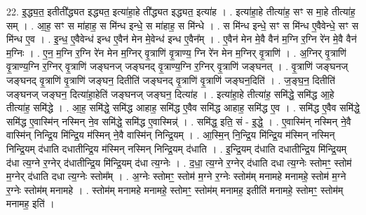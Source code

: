 \documentclass[17pt]{extarticle}
\begin{document}
22. इ॒द्ध्य॒त॒ इतीती᳚द्ध्यत इद्ध्यत॒ इत्या॑हा॒हे ती᳚द्ध्यत इद्ध्यत॒ इत्या॑ह । . इत्या॑हा॒हे तीत्या॑ह॒ सꣳ स मा॒हे तीत्या॑ह॒ सम् । . आ॒ह॒ सꣳ स मा॑हाह॒ स मि॑न्ध इन्धे॒ स मा॑हाह॒ स मि॑न्धे । . स मि॑न्ध इन्धे॒ सꣳ स मि॑न्ध ए॒वैवेन्धे॒ सꣳ स मि॑न्ध ए॒व । . इ॒न्ध॒ ए॒वैवेन्ध॑ इन्ध ए॒वैन॑ मेन मे॒वेन्ध॑ इन्ध ए॒वैन᳚म् । . ए॒वैन॑ मेन मे॒वै वैन॑ म॒ग्नि र॒ग्नि रे॑न मे॒वै वैन॑ म॒ग्निः । . ए॒न॒ म॒ग्नि र॒ग्नि रे॑न मेन म॒ग्निर् वृ॒त्राणि॑ वृ॒त्राण्य॒ ग्नि रे॑न मेन म॒ग्निर् वृ॒त्राणि॑ । . अ॒ग्निर् वृ॒त्राणि॑ वृ॒त्राण्य॒ग्नि र॒ग्निर् वृ॒त्राणि॑ जङ्घनज् जङ्घनद् वृ॒त्राण्य॒ग्नि र॒ग्निर् वृ॒त्राणि॑ जङ्घनत् । . वृ॒त्राणि॑ जङ्घनज् जङ्घनद् वृ॒त्राणि॑ वृ॒त्राणि॑ जङ्घन॒ दितीति॑ जङ्घनद् वृ॒त्राणि॑ वृ॒त्राणि॑ जङ्घन॒दिति॑ । . ज॒ङ्घ॒न॒ दितीति॑ जङ्घनज् जङ्घन॒ दित्या॑हा॒हेति॑ जङ्घनज् जङ्घन॒ दित्या॑ह । . इत्या॑हा॒हे तीत्या॑ह॒ समि॑द्धे॒ समि॑द्ध आ॒हे तीत्या॑ह॒ समि॑द्धे । . आ॒ह॒ समि॑द्धे॒ समि॑द्ध आहाह॒ समि॑द्ध ए॒वैव समि॑द्ध आहाह॒ समि॑द्ध ए॒व । . समि॑द्ध ए॒वैव समि॑द्धे॒ समि॑द्ध ए॒वास्मि॑न् नस्मिन् ने॒व समि॑द्धे॒ समि॑द्ध ए॒वास्मिन्न्॑ । . समि॑द्ध॒ इति॒ सं - इ॒द्धे॒ । . ए॒वास्मि॑न् नस्मिन् ने॒वै वास्मि॑न् निन्द्रि॒य मि॑न्द्रि॒य म॑स्मिन् ने॒वै वास्मि॑न् निन्द्रि॒यम् । . आ॒स्मि॒न् नि॒न्द्रि॒य मि॑न्द्रि॒य म॑स्मिन् नस्मिन् निन्द्रि॒यम् द॑धाति दधातीन्द्रि॒य म॑स्मिन् नस्मिन् निन्द्रि॒यम् द॑धाति । . इ॒न्द्रि॒यम् द॑धाति दधातीन्द्रि॒य मि॑न्द्रि॒यम् द॑धा त्य॒ग्ने र॒ग्नेर् द॑धातीन्द्रि॒य मि॑न्द्रि॒यम् द॑धा त्य॒ग्नेः । . द॒धा॒ त्य॒ग्ने र॒ग्नेर् द॑धाति दधा त्य॒ग्नेः स्तोमꣳ॒॒ स्तोम॑ म॒ग्नेर् द॑धाति दधा त्य॒ग्नेः स्तोम᳚म् । . अ॒ग्नेः स्तोमꣳ॒॒ स्तोम॑ म॒ग्ने र॒ग्नेः स्तोम॑म् मनामहे मनामहे॒ स्तोम॑ म॒ग्ने र॒ग्नेः स्तोम॑म् मनामहे । . स्तोम॑म् मनामहे मनामहे॒ स्तोमꣳ॒॒ स्तोम॑म् मनामह॒ इतीति॑ मनामहे॒ स्तोमꣳ॒॒ स्तोम॑म् मनामह॒ इति॑ । \newline
\end{document}
